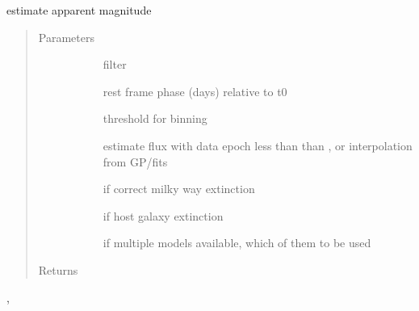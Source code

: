 \documentclass[letterpaper,10pt,english]{sphinxmanual}
\begin{document}
\begin{fulllineitems}
\label{\detokenize{generated/sdapy.snerun.snobject._mag_at:sdapy.snerun.snobject._mag_at}}
estimate apparent magnitude
\begin{quote}\begin{description}
\item[{Parameters}] \leavevmode\begin{description}
\item[{}] \leavevmode{[}\sphinxtitleref{str}{]}
filter

\item[{}] \leavevmode{[}\sphinxtitleref{float}{]}
rest frame phase (days) relative to t0

\item[{}] \leavevmode{[}\sphinxtitleref{float}{]}
threshold for binning

\item[{}] \leavevmode{[}\sphinxtitleref{str}{]}
estimate flux with data epoch less than than , or interpolation from GP/fits

\item[{}] \leavevmode{[}\sphinxtitleref{bool}{]}
if correct milky way extinction

\item[{}] \leavevmode{[}\sphinxtitleref{bool}{]}
if host galaxy extinction

\item[{}] \leavevmode{[}\sphinxtitleref{int}{]}
if multiple models available, which of them to be used

\end{description}

\item[{Returns}] \leavevmode\begin{description}
\item[{}] \leavevmode{[}\sphinxtitleref{float}{]}
\item[{}] \leavevmode{[}\sphinxtitleref{float}{]}
\end{description}

\end{description}\end{quote}



\begin{description}
\item[{, }] \leavevmode
\end{description}



\end{fulllineitems}
\end{document}
